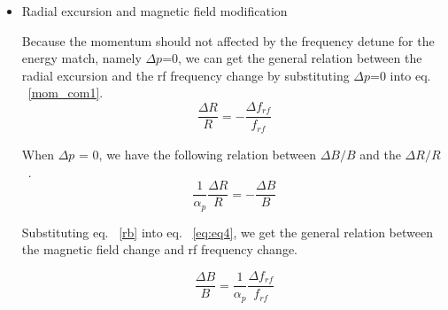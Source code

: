 \begin {itemize}
\item Radial excursion and magnetic field modification

Because the momentum should not affected by the frequency detune for the energy match, namely $\Delta p$=0, we can get the general relation between the radial excursion and the rf frequency change by substituting $\Delta p$=0 into eq. ~\ref{mom_com1}.
\begin{equation}
\frac{\Delta{R}}{R}= - \frac{\Delta f_{\mathit{rf}}}{f_{\mathit{rf}}} 
\label{eq:eq4}
\end{equation}



When $\Delta p$ = 0, we have the following relation between $\Delta B/B$ and the $\Delta R/R$ ~\cite{werkema_differential_2001}.
%
%
\begin{equation}
\frac{1}{\alpha_p} \frac{\Delta R}{R} = -\frac{\Delta{B}}{B}\label{rb}
\end{equation}

Substituting eq. ~\ref{rb} into eq. ~\ref{eq:eq4}, we get the general relation between the magnetic field change and rf frequency change.

\begin{equation}
\frac{\Delta{B}}{B}= \frac{1}{\alpha_p} \frac{\Delta f_{\mathit{rf}}}{f_{\mathit{rf}}} 
\label{eq:eq5}
\end{equation}
\end {itemize}



